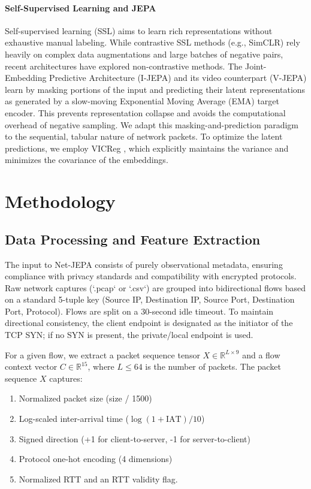 \documentclass{article}
\begin{document}
\paragraph{Self-Supervised Learning and JEPA}
Self-supervised learning (SSL) aims to learn rich representations without exhaustive manual labeling. While contrastive SSL methods (e.g., SimCLR) rely heavily on complex data augmentations and large batches of negative pairs, recent architectures have explored non-contrastive methods. The Joint-Embedding Predictive Architecture (I-JEPA) \cite{assran2023ijepa} and its video counterpart (V-JEPA) \cite{bardes2024vjepa} learn by masking portions of the input and predicting their latent representations as generated by a slow-moving Exponential Moving Average (EMA) target encoder. This prevents representation collapse and avoids the computational overhead of negative sampling. We adapt this masking-and-prediction paradigm to the sequential, tabular nature of network packets. To optimize the latent predictions, we employ VICReg \cite{bardes2021vicreg}, which explicitly maintains the variance and minimizes the covariance of the embeddings.

\section{Methodology}

\subsection{Data Processing and Feature Extraction}

The input to Net-JEPA consists of purely observational metadata, ensuring compliance with privacy standards and compatibility with encrypted protocols. Raw network captures (`.pcap` or `.csv`) are grouped into bidirectional flows based on a standard 5-tuple key (Source IP, Destination IP, Source Port, Destination Port, Protocol). Flows are split on a 30-second idle timeout. To maintain directional consistency, the client endpoint is designated as the initiator of the TCP SYN; if no SYN is present, the private/local endpoint is used.

For a given flow, we extract a packet sequence tensor $X \in \mathbb{R}^{L \times 9}$ and a flow context vector $C \in \mathbb{R}^{15}$, where $L \le 64$ is the number of packets.
The packet sequence $X$ captures:
\begin{enumerate}
    \item Normalized packet size (size / 1500)
    \item Log-scaled inter-arrival time ($\log(1 + \text{IAT}) / 10$)
    \item Signed direction (+1 for client-to-server, -1 for server-to-client)
    \item Protocol one-hot encoding (4 dimensions)
    \item Normalized RTT and an RTT validity flag.
\end{enumerate}
\end{document}
